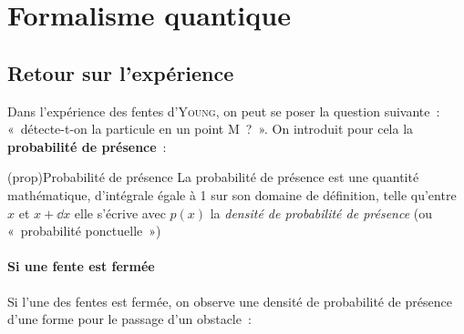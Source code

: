 \documentclass[../../main/main.tex]{subfiles}
\begin{document}
\section{Formalisme quantique}
\label{sec:formQ}
\subsection{Retour sur l'expérience}
\label{ssec:introprob}
Dans l'expérience des fentes d'\textsc{Young}, on peut se poser la question
suivante~: «~détecte-t-on la particule en un point M~?~». On introduit pour cela
la \textbf{probabilité de présence}~:
\begin{tcb*}(prop){Probabilité de présence}
	La probabilité de présence est une quantité mathématique, d'intégrale égale à 1
	sur son domaine de définition, telle qu'entre $x$ et $x+\dd{x}$ elle s'écrive
	\psw{%
		\[
			\dd{P} = p (x) \dd{x}
		\]
	}%
	avec $p (x)$ la \textit{densité de probabilité de présence} (ou «~probabilité
	ponctuelle~»)
\end{tcb*}
\noindent
\begin{minipage}[c]{.55\linewidth}
	\paragraph*{Si une fente est fermée}
	Si l'une des fentes est fermée, on observe une densité de probabilité de
	présence d'une forme pour le passage d'un obstacle~:
\end{minipage}
\hfill
\begin{minipage}[c]{.43\linewidth}
	\begin{center}
	\end{center}
\end{minipage}
\end{document}

